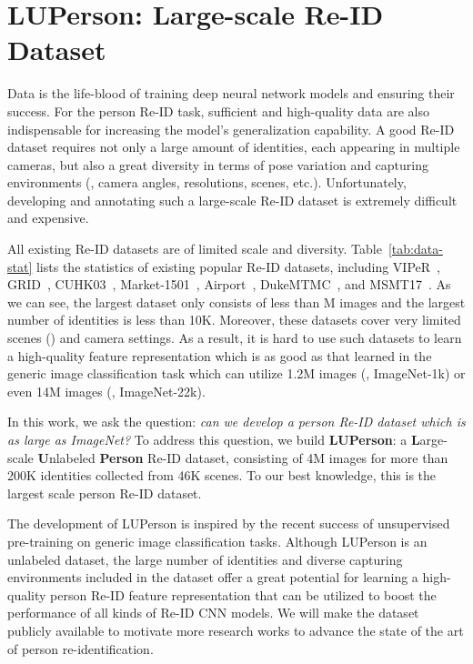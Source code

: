 \documentclass[final]{cvpr}
\newcommand{\Tref}[1]{Table~\ref{#1}}
\begin{document}
\section{LUPerson: Large-scale Re-ID Dataset}
\label{sec:LUPerson}

Data is the life-blood of training deep neural network models and ensuring their success. For the person Re-ID task, sufficient and high-quality data are also indispensable for increasing the model's generalization capability. A good Re-ID dataset requires not only a large amount of identities, each appearing in multiple cameras, but also a great diversity in terms of pose variation and capturing environments (\eg, camera angles, resolutions, scenes, etc.). Unfortunately, developing and annotating such a large-scale Re-ID dataset is extremely difficult and expensive.

All existing Re-ID datasets are of limited scale and diversity. \Tref{tab:data-stat} lists the statistics of existing popular Re-ID datasets, including VIPeR~\cite{gray2008viewpoint}, GRID~\cite{loy2013person}, CUHK03~\cite{li2014deepreid}, Market-1501~\cite{Zheng2015ScalablePR}, Airport~\cite{karanam2016comprehensive}, DukeMTMC~\cite{zheng2017unlabeled}, and MSMT17~\cite{wei2018person}. As we can see, the largest dataset only consists of less than M images and the largest number of identities is less than 10K. Moreover, these datasets cover very limited scenes () and camera settings. As a result, it is hard to use such datasets to learn a high-quality feature representation which is as good as that learned in the generic image classification task which can utilize 1.2M images (\ie, ImageNet-1k) or even 14M images (\ie, ImageNet-22k).

In this work, we ask the question: \textit{can we develop a person Re-ID dataset which is as large as ImageNet?} To address this question, we build \textbf{LUPerson}: a \textbf{L}arge-scale \textbf{U}nlabeled \textbf{Person} Re-ID dataset, consisting of 4M images for more than 200K identities collected from 46K scenes. To our best knowledge, this is the largest scale person Re-ID dataset. 

The development of LUPerson is inspired by the recent success of unsupervised pre-training on generic image classification tasks. Although LUPerson is an unlabeled dataset, the large number of identities and diverse capturing environments included in the dataset offer a great potential for learning a high-quality person Re-ID feature representation that can be utilized to boost the performance of all kinds of Re-ID CNN models. We will make the dataset publicly available to motivate more research works to advance the state of the art of person re-identification.
\end{document}
